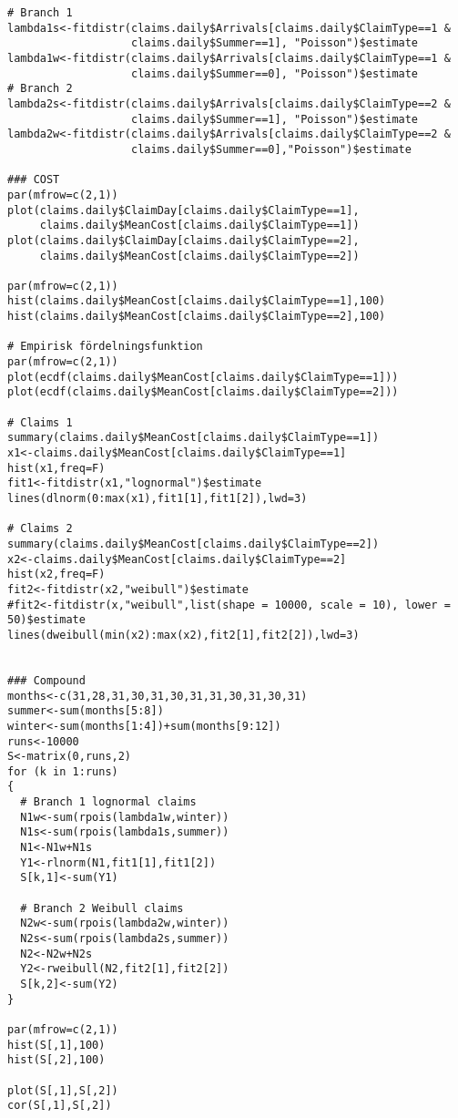 \documentclass[11pt]{article}
\begin{document}
\begin{verbatim}
# Branch 1
lambda1s<-fitdistr(claims.daily$Arrivals[claims.daily$ClaimType==1 &
                   claims.daily$Summer==1], "Poisson")$estimate
lambda1w<-fitdistr(claims.daily$Arrivals[claims.daily$ClaimType==1 &
                   claims.daily$Summer==0], "Poisson")$estimate
# Branch 2
lambda2s<-fitdistr(claims.daily$Arrivals[claims.daily$ClaimType==2 &
                   claims.daily$Summer==1], "Poisson")$estimate
lambda2w<-fitdistr(claims.daily$Arrivals[claims.daily$ClaimType==2 &
                   claims.daily$Summer==0],"Poisson")$estimate

### COST
par(mfrow=c(2,1))
plot(claims.daily$ClaimDay[claims.daily$ClaimType==1],
     claims.daily$MeanCost[claims.daily$ClaimType==1])
plot(claims.daily$ClaimDay[claims.daily$ClaimType==2],
     claims.daily$MeanCost[claims.daily$ClaimType==2])

par(mfrow=c(2,1))
hist(claims.daily$MeanCost[claims.daily$ClaimType==1],100)
hist(claims.daily$MeanCost[claims.daily$ClaimType==2],100)

# Empirisk fördelningsfunktion
par(mfrow=c(2,1))
plot(ecdf(claims.daily$MeanCost[claims.daily$ClaimType==1]))
plot(ecdf(claims.daily$MeanCost[claims.daily$ClaimType==2]))

# Claims 1
summary(claims.daily$MeanCost[claims.daily$ClaimType==1])
x1<-claims.daily$MeanCost[claims.daily$ClaimType==1]
hist(x1,freq=F)
fit1<-fitdistr(x1,"lognormal")$estimate
lines(dlnorm(0:max(x1),fit1[1],fit1[2]),lwd=3)

# Claims 2
summary(claims.daily$MeanCost[claims.daily$ClaimType==2])
x2<-claims.daily$MeanCost[claims.daily$ClaimType==2]
hist(x2,freq=F)
fit2<-fitdistr(x2,"weibull")$estimate
#fit2<-fitdistr(x,"weibull",list(shape = 10000, scale = 10), lower = 50)$estimate
lines(dweibull(min(x2):max(x2),fit2[1],fit2[2]),lwd=3)


### Compound
months<-c(31,28,31,30,31,30,31,31,30,31,30,31)
summer<-sum(months[5:8])
winter<-sum(months[1:4])+sum(months[9:12])
runs<-10000
S<-matrix(0,runs,2)
for (k in 1:runs)
{
  # Branch 1 lognormal claims
  N1w<-sum(rpois(lambda1w,winter))
  N1s<-sum(rpois(lambda1s,summer))
  N1<-N1w+N1s
  Y1<-rlnorm(N1,fit1[1],fit1[2])
  S[k,1]<-sum(Y1)
  
  # Branch 2 Weibull claims
  N2w<-sum(rpois(lambda2w,winter))
  N2s<-sum(rpois(lambda2s,summer))
  N2<-N2w+N2s
  Y2<-rweibull(N2,fit2[1],fit2[2])
  S[k,2]<-sum(Y2)
}

par(mfrow=c(2,1))
hist(S[,1],100)
hist(S[,2],100)

plot(S[,1],S[,2])
cor(S[,1],S[,2])


\end{verbatim}
\end{document}
